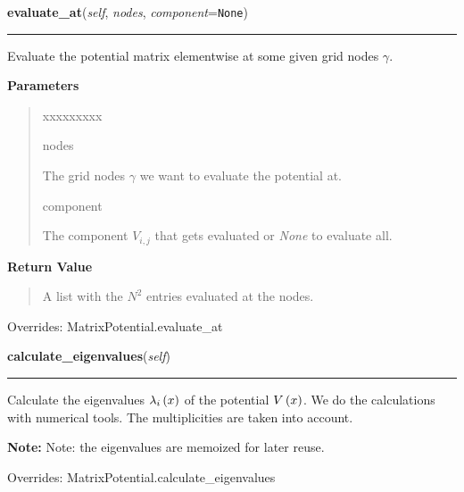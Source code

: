 \hspace{.8\funcindent}\begin{boxedminipage}{\funcwidth}

    \raggedright \textbf{evaluate\_at}(\textit{self}, \textit{nodes}, \textit{component}={\tt None})

    \vspace{-1.5ex}

    \rule{\textwidth}{0.5\fboxrule}
\setlength{\parskip}{2ex}
    Evaluate the potential matrix elementwise at some given grid nodes
    $\gamma$.

\setlength{\parskip}{1ex}
      \textbf{Parameters}
      \vspace{-1ex}

      \begin{quote}
        \begin{Ventry}{xxxxxxxxx}

          \item[nodes]

          The grid nodes $\gamma$ we want to evaluate the
          potential at.

          \item[component]

          The component $V_{i,j}$ that gets evaluated or \textit{None} to
          evaluate all.

        \end{Ventry}

      \end{quote}

      \textbf{Return Value}
    \vspace{-1ex}

      \begin{quote}
      A list with the $N^2$ entries evaluated at the
      nodes.

      \end{quote}



      Overrides: MatrixPotential.evaluate\_at

    \end{boxedminipage}

    \vspace{0.5ex}

\hspace{.8\funcindent}\begin{boxedminipage}{\funcwidth}

    \raggedright \textbf{calculate\_eigenvalues}(\textit{self})

    \vspace{-1.5ex}

    \rule{\textwidth}{0.5\fboxrule}
\setlength{\parskip}{2ex}
    Calculate the eigenvalues
    $\lambda_i\left( x \right)$ of the potential
    $V\left( x \right)$. We do the calculations with numerical
    tools. The multiplicities are taken into account.

\setlength{\parskip}{1ex}
\textbf{Note:} Note: the eigenvalues are memoized for later reuse.


      Overrides: MatrixPotential.calculate\_eigenvalues




    \end{boxedminipage}

